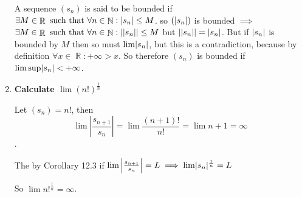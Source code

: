 \documentclass[10pt,a4paper]{article}
\DeclareMathOperator*{\R}{\mathbb{R}}
\DeclareMathOperator*{\N}{\mathbb{N}}
\DeclarePairedDelimiter{\abs}{\lvert}{\rvert}
\begin{document}
\begin{enumerate}
        A sequence $(s_n)$ is said to be bounded if $\exists M \in \R \text{ such that } \forall n \in \N: \abs{s_n}  \leq M$.  so  $(\abs{s_n})$ is bounded $\implies$ $\exists M \in \R \text{ such that } \forall n \in \N: \abs{\abs{s_n}}  \leq M$ but $\abs{\abs{s_n}} = \abs{s_n}$. But if $\abs{s_n}$ is  bounded by $M$ then so must $\lim \abs{s_n}$, but this is a contradiction, because by definition $\forall x \in \R : +\infty > x$. So therefore 
        $(s_n)$ is bounded if $\limsup\abs{s_n} < +\infty$.

    \item \textbf{ Calculate $\lim (n!)^\frac{1}{n}$}

        Let $(s_n) = n!$, then $$\lim \left \vert \frac{s_{n+1}}{s_n}  \right \vert = \lim \frac{(n+1)!}{n!} = \lim n+1 = \infty$$. 

        The by Corollary 12.3 if $\lim \left \vert \frac{s_{n+1}}{s_n} \right \vert = L \implies \lim \abs{s_n}^{\frac{1}{n}} = L$

        So $\lim {n!}^\frac{1}{n} = \infty$.

\end{enumerate}
\end{document}
